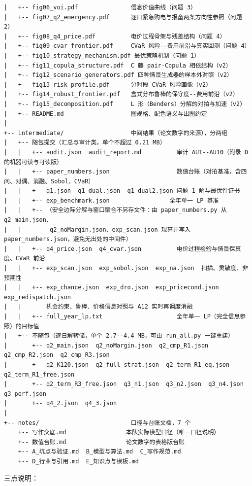 \begin{lstlisting}[style=plain]
|   +-- fig06_voi.pdf               信息价值曲线（问题 3）
|   +-- fig07_q2_emergency.pdf      逐日紧急购电与报童两条方向性参照（问题 2）
|   +-- fig08_q4_price.pdf          电价过程骨架与残差结构（问题 4）
|   +-- fig09_cvar_frontier.pdf     CVaR 风险--费用前沿与真实回测（问题 4）
|   +-- fig10_strategy_mechanism.pdf 最优策略机制（问题 1）
|   +-- fig11_copula_structure.pdf  C 藤 pair-Copula 相依结构（v2）
|   +-- fig12_scenario_generators.pdf 四种情景生成器的样本外对照（v2）
|   +-- fig13_risk_profile.pdf      分时段 CVaR 风险画像（v2）
|   +-- fig14_robust_frontier.pdf   盒式分布鲁棒的保守度--费用前沿（v2）
|   +-- fig15_decomposition.pdf     L 形（Benders）分解的对拍与加速（v2）
|   +-- README.md                   图规格、配色语义与出图约定
|
+-- intermediate/                   中间结果（论文数字的来源），分两组
|   +-- 随包提交（汇总与审计类，单个不超过 0.21 MB）
|   |   +-- audit.json  audit_report.md          审计 AU1--AU10（附录 D 的机器可读与可读版）
|   |   +-- paper_numbers.json                   数值台账（对拍基准，含四问、对偶、消融、Sobol、CVaR）
|   |   +-- q1.json  q1_dual.json  q1_dual2.json 问题 1 解与最优性证书
|   |   +-- exp_benchmark.json                 全年单一 LP 基准
|   |   +-- （安全边际分解与窗口聚合不另存文件：由 paper_numbers.py 从 q2_main.json、
|   |        q2_noMargin.json、exp_scan.json 现算并写入 paper_numbers.json，避免无出处的中间件）
|   |   +-- q4_price.json  q4_cvar.json          电价过程检验与情景保真度、CVaR 前沿
|   |   +-- exp_scan.json  exp_sobol.json  exp_na.json  扫描、灵敏度、非预期性
|   |   +-- exp_chance.json  exp_dro.json  exp_pricecond.json  exp_redispatch.json
|   |       机会约束、鲁棒、价格信息对照与 A12 实时再调度消融
|   |   +-- full_year_lp.txt                     全年单一 LP（完全信息参照）的目标值
|   +-- 不随包（逐日解转储，单个 2.7--4.4 MB，可由 run_all.py 一键重建）
|       +-- q2_main.json  q2_noMargin.json  q2_cmp_R1.json  q2_cmp_R2.json  q2_cmp_R3.json
|       +-- q2_K120.json  q2_full_strat.json  q2_term_R1_eq.json  q2_term_R1_free.json
|       +-- q2_term_R3_free.json  q3_n1.json  q3_n2.json  q3_n4.json  q3_perf.json
|       +-- q4_2.json  q4_3.json
|
+-- notes/                          口径与台账文档，7 个
    +-- 写作交底.md                 本队实际模型口径（唯一口径说明）
    +-- 数值台账.md                 论文数字的表格版台账
    +-- A_坑点与验证.md  B_模型与算法.md  C_写作规范.md
    +-- D_行业与引用.md  E_知识点与模板.md
\end{lstlisting}

三点说明：


